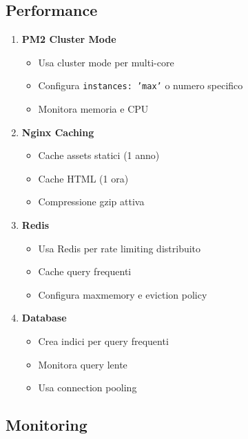 \documentclass[11pt,a4paper]{article}
\newcommand{\code}[1]{\texttt{#1}}
\begin{document}
\subsection{Performance}

\begin{enumerate}
    \item \textbf{PM2 Cluster Mode}
    \begin{itemize}
        \item Usa cluster mode per multi-core
        \item Configura \code{instances: 'max'} o numero specifico
        \item Monitora memoria e CPU
    \end{itemize}
    
    \item \textbf{Nginx Caching}
    \begin{itemize}
        \item Cache assets statici (1 anno)
        \item Cache HTML (1 ora)
        \item Compressione gzip attiva
    \end{itemize}
    
    \item \textbf{Redis}
    \begin{itemize}
        \item Usa Redis per rate limiting distribuito
        \item Cache query frequenti
        \item Configura maxmemory e eviction policy
    \end{itemize}
    
    \item \textbf{Database}
    \begin{itemize}
        \item Crea indici per query frequenti
        \item Monitora query lente
        \item Usa connection pooling
    \end{itemize}
\end{enumerate}

\subsection{Monitoring}
\end{document}
